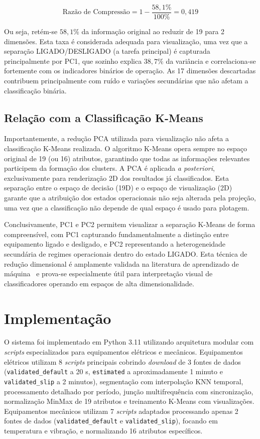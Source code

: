 \begin{equation}
    \text{Razão de Compressão} = 1 - \frac{58,1\%}{100\%} = 0,419
    \label{eq:compression_ratio}
\end{equation}

Ou seja, retém-se $58,1\%$ da informação original ao reduzir de 19 para 2 dimensões. Esta taxa é considerada adequada para visualização, uma vez que a separação \mbox{LIGADO/DESLIGADO} (a tarefa principal) é capturada principalmente por PC1, que sozinho explica $38,7\%$ da variância e correlaciona-se fortemente com os indicadores binários de operação. As 17 dimensões descartadas contribuem principalmente com ruído e variações secundárias que não afetam a classificação binária.

\subsection{Relação com a Classificação K-Means}

Importantemente, a redução PCA utilizada para visualização não afeta a classificação K-Means realizada. O algoritmo K-Means opera sempre no espaço original de 19 (ou 16) atributos, garantindo que todas as informações relevantes participem da formação dos clusters. A PCA é aplicada \textit{a posteriori}, exclusivamente para renderização 2D dos resultados já classificados. Esta separação entre o espaço de decisão (19D) e o espaço de visualização (2D) garante que a atribuição dos estados operacionais não seja alterada pela projeção, uma vez que a classificação não depende de qual espaço é usado para plotagem.

Conclusivamente, PC1 e PC2 permitem visualizar a separação K-Means de forma compreensível, com PC1 capturando fundamentalmente a distinção entre equipamento ligado e desligado, e PC2 representando a heterogeneidade secundária de regimes operacionais dentro do estado LIGADO. Esta técnica de redução dimensional é amplamente validada na literatura de aprendizado de máquina~\cite{bishop2006pattern, turk1991eigenfaces} e prova-se especialmente útil para interpretação visual de classificadores operando em espaços de alta dimensionalidade.

\section{Implementação}

O sistema foi implementado em Python 3.11 utilizando arquitetura modular com \textit{scripts} especializados para equipamentos elétricos e mecânicos. Equipamentos elétricos utilizam 8 \textit{scripts} principais cobrindo \textit{download} de 3 fontes de dados (\texttt{validated\_\allowbreak default} a 20 s, \texttt{estimated} a aproximadamente 1 minuto e \texttt{validated\_\allowbreak slip} a 2 minutos), segmentação com interpolação KNN temporal, processamento detalhado por período, junção multifrequência com sincronização, normalização MinMax de 19 atributos e treinamento K-Means com visualizações. Equipamentos mecânicos utilizam 7 \textit{scripts} adaptados processando apenas 2 fontes de dados (\texttt{validated\_\allowbreak default} e \texttt{validated\_\allowbreak slip}), focando em temperatura e vibração, e normalizando 16 atributos específicos.

